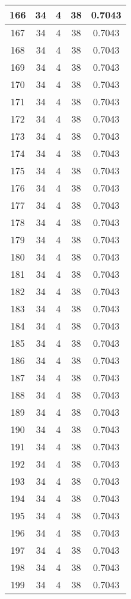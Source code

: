 \documentclass[letterpaper, 12pt]{article}
\begin{document}
\begin{longtable}{|c|c|c|c|c|}
166 & 34 & 4 & 38 & 0.7043 \\
\hline
167 & 34 & 4 & 38 & 0.7043 \\
\hline
168 & 34 & 4 & 38 & 0.7043 \\
\hline
169 & 34 & 4 & 38 & 0.7043 \\
\hline
170 & 34 & 4 & 38 & 0.7043 \\
\hline
171 & 34 & 4 & 38 & 0.7043 \\
\hline
172 & 34 & 4 & 38 & 0.7043 \\
\hline
173 & 34 & 4 & 38 & 0.7043 \\
\hline
174 & 34 & 4 & 38 & 0.7043 \\
\hline
175 & 34 & 4 & 38 & 0.7043 \\
\hline
176 & 34 & 4 & 38 & 0.7043 \\
\hline
177 & 34 & 4 & 38 & 0.7043 \\
\hline
178 & 34 & 4 & 38 & 0.7043 \\
\hline
179 & 34 & 4 & 38 & 0.7043 \\
\hline
180 & 34 & 4 & 38 & 0.7043 \\
\hline
181 & 34 & 4 & 38 & 0.7043 \\
\hline
182 & 34 & 4 & 38 & 0.7043 \\
\hline
183 & 34 & 4 & 38 & 0.7043 \\
\hline
184 & 34 & 4 & 38 & 0.7043 \\
\hline
185 & 34 & 4 & 38 & 0.7043 \\
\hline
186 & 34 & 4 & 38 & 0.7043 \\
\hline
187 & 34 & 4 & 38 & 0.7043 \\
\hline
188 & 34 & 4 & 38 & 0.7043 \\
\hline
189 & 34 & 4 & 38 & 0.7043 \\
\hline
190 & 34 & 4 & 38 & 0.7043 \\
\hline
191 & 34 & 4 & 38 & 0.7043 \\
\hline
192 & 34 & 4 & 38 & 0.7043 \\
\hline
193 & 34 & 4 & 38 & 0.7043 \\
\hline
194 & 34 & 4 & 38 & 0.7043 \\
\hline
195 & 34 & 4 & 38 & 0.7043 \\
\hline
196 & 34 & 4 & 38 & 0.7043 \\
\hline
197 & 34 & 4 & 38 & 0.7043 \\
\hline
198 & 34 & 4 & 38 & 0.7043 \\
\hline
199 & 34 & 4 & 38 & 0.7043 \\
\hline
\end{longtable}
\end{document}
